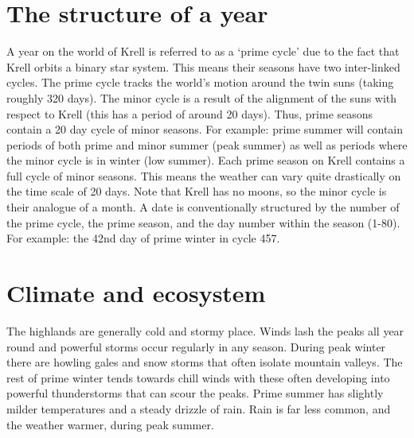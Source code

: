 \documentclass[a4paper,11pt,oneside]{book}
\begin{document}
\section{The structure of a year}
A year on the world of Krell is referred to as a `prime cycle' due to the fact that Krell orbits a binary star system. This means their seasons have two inter-linked cycles. The prime cycle tracks the world's motion around the twin suns (taking roughly 320 days). The minor cycle is a result of the alignment of the suns with respect to Krell (this has a period of around 20 days). Thus, prime seasons contain a 20 day cycle of minor seasons. For example: prime summer will contain periods of both prime and minor summer (peak summer) as well as periods where the minor cycle is in winter (low summer). Each prime season on Krell contains a full cycle of minor seasons. This means the weather can vary quite drastically on the time scale of 20 days. Note that Krell has no moons, so the minor cycle is their analogue of a month. A date is conventionally structured by the number of the prime cycle, the prime season, and the day number within the season (1-80). For example: the 42nd day of prime winter in cycle 457.

\section{Climate and ecosystem}
The highlands are generally cold and stormy place. Winds lash the peaks all year round and powerful storms occur regularly in any season. During peak winter there are howling gales and snow storms that often isolate mountain valleys. The rest of prime winter tends towards chill winds with these often developing into powerful thunderstorms that can scour the peaks. Prime summer has slightly milder temperatures and a steady drizzle of rain. Rain is far less common, and the weather warmer, during peak summer. 
\end{document}
